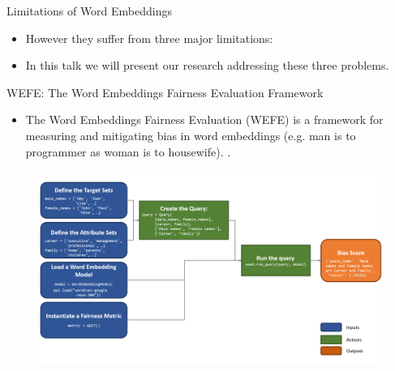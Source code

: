 \documentclass[handout]{beamer}
\begin{document}
\begin{frame}{Limitations of Word Embeddings}
\begin{scriptsize}
\begin{itemize}


\item However they suffer from three major limitations:



\item In this talk we will present our research addressing these three problems.

\end{itemize}
\end{scriptsize}
\end{frame}



\begin{frame}{WEFE: The Word Embeddings Fairness Evaluation Framework}
\begin{scriptsize}
\begin{itemize}
 \item The Word Embeddings Fairness Evaluation (WEFE) is a framework for measuring and mitigating bias in word embeddings (e.g. man is to programmer as woman is to housewife). \cite{badilla2020wefe}.
\end{itemize}
  \begin{figure}[h]
        	\includegraphics[scale = 0.2]{pics/wefedia.png}
        \end{figure}

\end{scriptsize}
\end{frame}
\end{document}
